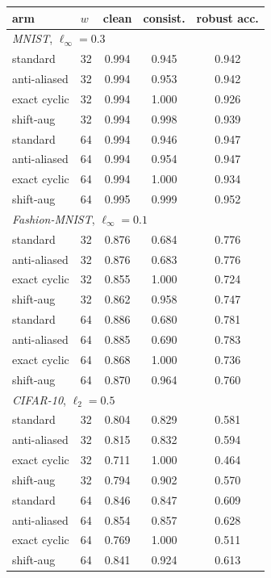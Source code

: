 \begin{tabular}{ll ccc}
\toprule
arm & $w$ & clean & consist. & robust acc. \\
\midrule
\multicolumn{5}{l}{\emph{MNIST}, $\ell_\infty=0.3$} \\
standard & 32 & 0.994 & 0.945 & 0.942 \\
anti-aliased & 32 & 0.994 & 0.953 & 0.942 \\
exact cyclic & 32 & 0.994 & 1.000 & 0.926 \\
shift-aug & 32 & 0.994 & 0.998 & 0.939 \\
standard & 64 & 0.994 & 0.946 & 0.947 \\
anti-aliased & 64 & 0.994 & 0.954 & 0.947 \\
exact cyclic & 64 & 0.994 & 1.000 & 0.934 \\
shift-aug & 64 & 0.995 & 0.999 & 0.952 \\
\midrule
\multicolumn{5}{l}{\emph{Fashion-MNIST}, $\ell_\infty=0.1$} \\
standard & 32 & 0.876 & 0.684 & 0.776 \\
anti-aliased & 32 & 0.876 & 0.683 & 0.776 \\
exact cyclic & 32 & 0.855 & 1.000 & 0.724 \\
shift-aug & 32 & 0.862 & 0.958 & 0.747 \\
standard & 64 & 0.886 & 0.680 & 0.781 \\
anti-aliased & 64 & 0.885 & 0.690 & 0.783 \\
exact cyclic & 64 & 0.868 & 1.000 & 0.736 \\
shift-aug & 64 & 0.870 & 0.964 & 0.760 \\
\midrule
\multicolumn{5}{l}{\emph{CIFAR-10}, $\ell_2=0.5$} \\
standard & 32 & 0.804 & 0.829 & 0.581 \\
anti-aliased & 32 & 0.815 & 0.832 & 0.594 \\
exact cyclic & 32 & 0.711 & 1.000 & 0.464 \\
shift-aug & 32 & 0.794 & 0.902 & 0.570 \\
standard & 64 & 0.846 & 0.847 & 0.609 \\
anti-aliased & 64 & 0.854 & 0.857 & 0.628 \\
exact cyclic & 64 & 0.769 & 1.000 & 0.511 \\
shift-aug & 64 & 0.841 & 0.924 & 0.613 \\
\bottomrule
\end{tabular}